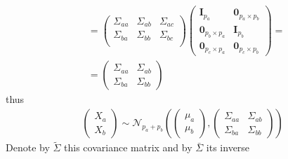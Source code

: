 \documentclass[10pt,notitlepage]{article}
\newcommand{\Id}{\mathbf{I}}
\newcommand{\ZeroM}{\mathbf{0}}
\begin{document}
\begin{exercise}[Solution]
\begin{enumerate}[(a)]
\begin{align*}
                        &=
                        \begin{pmatrix}
                            \Sigma_{aa} & \Sigma_{ab} & \Sigma_{ac}\\
                            \Sigma_{ba} & \Sigma_{bb} & \Sigma_{bc}\\
                        \end{pmatrix}
                        \begin{pmatrix}
                            \Id_{p_a} & \ZeroM_{p_a\times p_b} \\
                            \ZeroM_{p_b\times p_a} & \Id_{p_b}\\
                            \ZeroM_{p_c\times p_a} & \ZeroM_{p_c\times p_b}
                        \end{pmatrix} = \\
                        &= 
                        \begin{pmatrix}
                            \Sigma_{aa} & \Sigma_{ab}\\
                            \Sigma_{ba} & \Sigma_{bb}
                        \end{pmatrix}
                    \end{align*}
                    thus
                    \begin{align*}
                        \begin{pmatrix}
                            X_a\\
                            X_b
                        \end{pmatrix}
                        \sim\mathcal{N}_{p_a+p_b}\left(
                            \begin{pmatrix}
                                \mu_a\\
                                \mu_b 
                            \end{pmatrix},
                            \begin{pmatrix}
                                \Sigma_{aa} & \Sigma_{ab}\\
                                \Sigma_{ba} & \Sigma_{bb}
                            \end{pmatrix}
                            \right)
                    \end{align*}
                    Denote by $\tilde{\Sigma}$ this covariance matrix and by $\bar{\Sigma}$ its inverse
                    \begin{align*}

\end{align*}
\end{enumerate}
\end{exercise}
\end{document}
